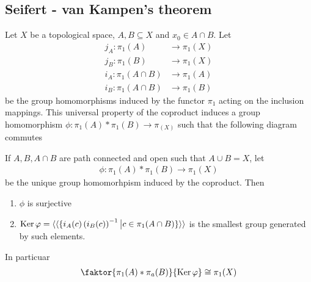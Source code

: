 \subsection{Seifert - van Kampen's theorem}

Let $X$ be a topological space, $A,B \subseteq X$ and $x_0 \in A \cap B$.
Let
\begin{align*}
  j_A: \pi_1(A) &\to \pi_1(X)\\
  j_B: \pi_1(B) &\to \pi_1(X)\\
  i_A: \pi_1(A\cap B) &\to \pi_1(A)\\
  i_B: \pi_1(A\cap B) &\to \pi_1(B)
\end{align*}
be the group homomorphisms induced by the functor $\pi_1$ acting on the inclusion mappings.
This universal property of the coproduct induces a group homomorphism
$\phi: \pi_1(A) \ast \pi_1(B) \to \pi_(X)$ such that the following diagram commutes
\begin{center}
\end{center}
\begin{thm}

If $A,B,A \cap B$ are path connected and open such that $A \cup B = X$, let
\begin{align*}
  \phi: \pi_1(A) \ast \pi_1(B) \to \pi_1(X)
\end{align*}
be the unique group homomorhpism induced by the coproduct. Then
\begin{enumerate}
  \item $\phi$ is surjective
  \item $\operatorname{Ker} \varphi = \langle\langle\{i_A(c)\left(
            i_B(c)
    \right)^{-1} \big\vert
    c \in \pi_1(A \cap B) 
    \}\rangle\rangle$ is the smallest group generated by such elements.
\end{enumerate}
In particuar
\begin{align*}
  \faktor{\pi_1(A) \ast \pi_a(B)}{\Ker \phi} \iso \pi_1(X)
\end{align*}
\end{thm}


